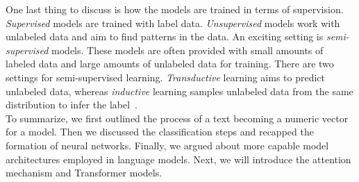 One last thing to discuss is how the models are trained in terms of supervision. \emph{Supervised} models are trained with label data. \emph{Unsupervised} models work with unlabeled data and aim to find patterns in the data. An exciting setting is \emph{semi-supervised} models. These models are often provided with small amounts of labeled data and large amounts of unlabeled data for training. There are two settings for semi-supervised learning. \emph{Transductive} learning aims to predict unlabeled data, whereas \emph{inductive} learning samples unlabeled data from the same distribution to
infer the label~\parencite{LearningByTransduction_Gammerman}.\\
To summarize, we first outlined the process of a text becoming a numeric vector for a model. Then we discussed the classification steps and recapped the formation of neural networks. Finally, we argued about more capable model architectures employed in language models. Next, we will introduce the attention mechanism and Transformer models.

